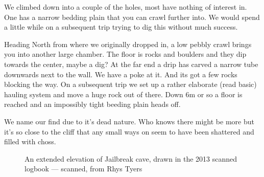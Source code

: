 We climbed down into a couple of the holes, most have nothing of interest in. One has a narrow bedding plain that you can crawl further into. We would spend a little while on a subsequent trip trying to dig this without much success. 
 
Heading North from where we originally dropped in, a low pebbly crawl brings you into another large chamber. The floor is rocks and boulders and they dip towards the center, maybe a dig? At the far end a drip has carved a narrow tube downwards next to the wall. We have a poke at it. And its got a few rocks blocking the way. On a subsequent trip we set up a rather elaborate (read basic) hauling  system and move a huge rock out of there. Down 6m or so a floor is reached and an impossibly tight beeding plain heads off.
 
We name our find  due to it’s dead nature. Who knows there might be more but it’s so close to the cliff that any small ways on seem to have been shattered and filled with choss.


\begin{figure}[t!]
\checkoddpage \ifoddpage \forcerectofloat \else \forceversofloat \fi
\centering
{}
\caption{An extended elevation of Jailbreak cave, drawn in the 2013 scanned logbook --- scanned, from Rhys Tyers }
\label{ee jailbreak}
\end{figure}



